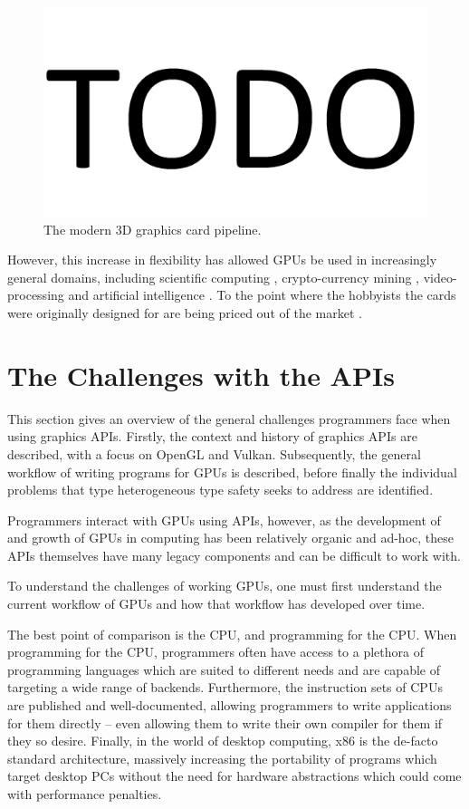 \documentclass[a4paper,12pt,twoside,openright]{report}
\begin{document}
\begin{figure}[h]
\centering
\includegraphics[width=0.8\linewidth]{TODO}
\caption{The modern 3D graphics card pipeline.}
\label{fig:graphics_pipeline}
\end{figure}

However, this increase in flexibility has allowed GPUs be used in increasingly
general domains, including scientific computing \cite{TODO}, crypto-currency
mining \cite{TODO}, video-processing \cite{TODO} and artificial intelligence
\cite{TODO}. To the point where the hobbyists the cards were originally
designed for are being priced out of the market \cite{TODO}.

\section{The Challenges with the APIs}

\label{sec:api_challanges}

This section gives an overview of the general challenges programmers face when
using graphics APIs. Firstly, the context and history of graphics APIs are
described, with a focus on OpenGL and Vulkan. Subsequently, the general
workflow of writing programs for GPUs is described, before finally the
individual problems that type heterogeneous type safety seeks to address are
identified.

Programmers interact with GPUs using APIs, however, as the development of and
growth of GPUs in computing has been relatively organic and ad-hoc, these APIs
themselves have many legacy components and can be difficult to work with.

To understand the challenges of working GPUs, one must first understand the
current workflow of GPUs and how that workflow has developed over time.

The best point of comparison is the CPU, and programming for the CPU. When
programming for the CPU, programmers often have access to a plethora of
programming languages which are suited to different needs and are capable of
targeting a wide range of backends. Furthermore, the instruction sets of CPUs
are published and well-documented, allowing programmers to write applications
for them directly -- even allowing them to write their own compiler for them
if they so desire. Finally, in the world of desktop computing, x86 is the
de-facto standard architecture, massively increasing the portability of
programs which target desktop PCs without the need for hardware abstractions
which could come with performance penalties.
\end{document}

